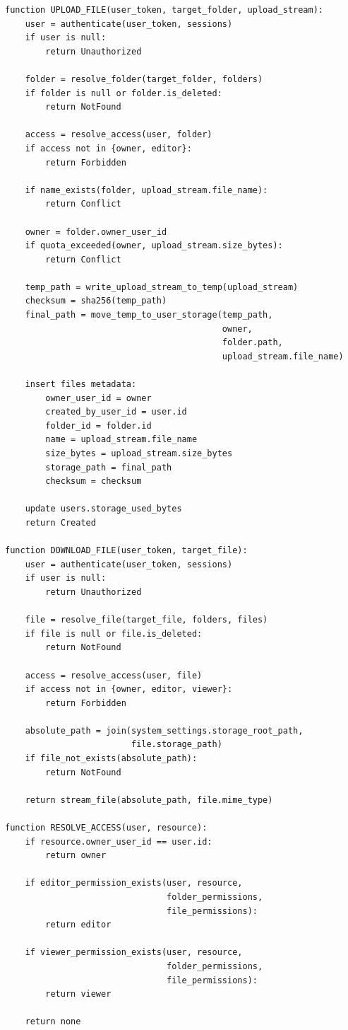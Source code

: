 \begin{lstlisting}[caption={Файл хадгалалтын үндсэн үйлдлийн псевдокод}, label={lst:storage-core-logic}]
function UPLOAD_FILE(user_token, target_folder, upload_stream):
    user = authenticate(user_token, sessions)
    if user is null:
        return Unauthorized

    folder = resolve_folder(target_folder, folders)
    if folder is null or folder.is_deleted:
        return NotFound

    access = resolve_access(user, folder)
    if access not in {owner, editor}:
        return Forbidden

    if name_exists(folder, upload_stream.file_name):
        return Conflict

    owner = folder.owner_user_id
    if quota_exceeded(owner, upload_stream.size_bytes):
        return Conflict

    temp_path = write_upload_stream_to_temp(upload_stream)
    checksum = sha256(temp_path)
    final_path = move_temp_to_user_storage(temp_path,
                                           owner,
                                           folder.path,
                                           upload_stream.file_name)

    insert files metadata:
        owner_user_id = owner
        created_by_user_id = user.id
        folder_id = folder.id
        name = upload_stream.file_name
        size_bytes = upload_stream.size_bytes
        storage_path = final_path
        checksum = checksum

    update users.storage_used_bytes
    return Created

function DOWNLOAD_FILE(user_token, target_file):
    user = authenticate(user_token, sessions)
    if user is null:
        return Unauthorized

    file = resolve_file(target_file, folders, files)
    if file is null or file.is_deleted:
        return NotFound

    access = resolve_access(user, file)
    if access not in {owner, editor, viewer}:
        return Forbidden

    absolute_path = join(system_settings.storage_root_path,
                         file.storage_path)
    if file_not_exists(absolute_path):
        return NotFound

    return stream_file(absolute_path, file.mime_type)

function RESOLVE_ACCESS(user, resource):
    if resource.owner_user_id == user.id:
        return owner

    if editor_permission_exists(user, resource,
                                folder_permissions,
                                file_permissions):
        return editor

    if viewer_permission_exists(user, resource,
                                folder_permissions,
                                file_permissions):
        return viewer

    return none
\end{lstlisting}

